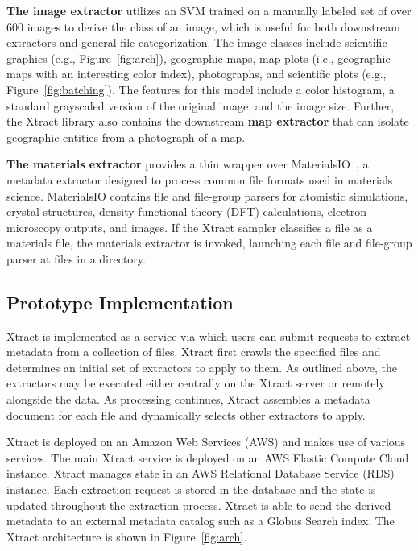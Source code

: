 \documentclass[sigconf]{acmart}
\newcommand{\ryan}[1]{}
\newcommand{\ryan}[1]{{\textcolor{magenta}{ Ryan: #1 }}}
\newcommand{\name}{Xtract}
\begin{document}
\textbf{The image extractor} utilizes an SVM trained on a manually labeled set of over 600 images to derive the class of an 
image, which is useful for both downstream extractors and general file categorization. The image classes include scientific 
graphics (e.g., Figure~\ref{fig:arch}), geographic maps, map plots (i.e., geographic maps with an 
interesting color index), photographs, and scientific plots (e.g., Figure~\ref{fig:batching}). 
The features for this model include a color histogram, a standard grayscaled version of the original image,
and the image size.  Further, the \name{} library also contains the downstream \textbf{map extractor} that 
can isolate geographic entities from a photograph of a map.

\textbf{The materials extractor} provides a thin wrapper over MaterialsIO~\cite{matio}, 
a metadata extractor designed to process common file formats used in materials science. 
MaterialsIO contains file and file-group parsers for atomistic simulations,
crystal structures, density functional theory (DFT) calculations, electron microscopy outputs, and images. 
If the \name{} sampler classifies a file as a materials file, the materials extractor is invoked, 
launching each file and file-group parser at files in a directory. 


\subsection{Prototype Implementation}

\name{} is implemented as a service via which users can submit
requests to extract metadata from a collection of files.
\name{} first crawls the specified files and determines
an initial set of extractors to apply to them. 
As outlined above, the extractors may be executed
either centrally on the \name{} server or remotely alongside
the data. As processing continues, \name{} assembles 
a metadata document for each file and dynamically selects
other extractors to apply.


\name{} is deployed on an Amazon Web Services (AWS) and makes use
of various services. The main \name{} service
is deployed on an AWS Elastic Compute Cloud instance.
\name{} manages state in an AWS Relational Database Service (RDS)
instance. Each extraction request is stored in the database
and the state is updated throughout the extraction process. 
\name{} is able to send the derived metadata to an external
metadata catalog such as a Globus Search index.
The \name{} architecture is shown in Figure~\ref{fig:arch}.
\end{document}
